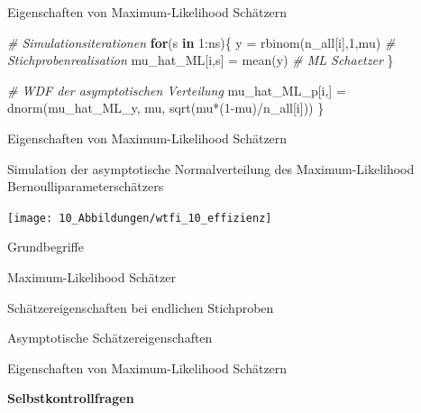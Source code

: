 \documentclass[
  8pt,
  ignorenonframetext,
]{beamer}
\newenvironment{Shaded}{\begin{snugshade}}{\end{snugshade}}
\newcommand{\CommentTok}[1]{\textcolor[rgb]{0.56,0.35,0.01}{\textit{#1}}}
\newcommand{\ControlFlowTok}[1]{\textcolor[rgb]{0.13,0.29,0.53}{\textbf{#1}}}
\newcommand{\DecValTok}[1]{\textcolor[rgb]{0.00,0.00,0.81}{#1}}
\newcommand{\FunctionTok}[1]{\textcolor[rgb]{0.00,0.00,0.00}{#1}}
\newcommand{\NormalTok}[1]{#1}
\newcommand{\OtherTok}[1]{\textcolor[rgb]{0.56,0.35,0.01}{#1}}
\newcommand{\SpecialCharTok}[1]{\textcolor[rgb]{0.00,0.00,0.00}{#1}}
\begin{document}
\begin{frame}[fragile]{Eigenschaften von Maximum-Likelihood Schätzern}
\begin{Shaded}
\begin{Highlighting}[]
    \CommentTok{\# Simulationsiterationen}
    \ControlFlowTok{for}\NormalTok{(s }\ControlFlowTok{in} \DecValTok{1}\SpecialCharTok{:}\NormalTok{ns)\{}
\NormalTok{        y               }\OtherTok{=} \FunctionTok{rbinom}\NormalTok{(n\_all[i],}\DecValTok{1}\NormalTok{,mu)             }\CommentTok{\# Stichprobenrealisation}
\NormalTok{        mu\_hat\_ML[i,s]  }\OtherTok{=} \FunctionTok{mean}\NormalTok{(y)                           }\CommentTok{\# ML Schaetzer}
\NormalTok{    \}}

    \CommentTok{\# WDF der asymptotischen Verteilung}
\NormalTok{    mu\_hat\_ML\_p[i,] }\OtherTok{=} \FunctionTok{dnorm}\NormalTok{(mu\_hat\_ML\_y, mu, }\FunctionTok{sqrt}\NormalTok{(mu}\SpecialCharTok{*}\NormalTok{(}\DecValTok{1}\SpecialCharTok{{-}}\NormalTok{mu)}\SpecialCharTok{/}\NormalTok{n\_all[i]))}
\NormalTok{\}}
\end{Highlighting}
\end{Shaded}
\end{frame}

\begin{frame}{Eigenschaften von Maximum-Likelihood Schätzern}
\protect\hypertarget{eigenschaften-von-maximum-likelihood-schuxe4tzern-2}{}
\small

Simulation der asymptotische Normalverteilung des Maximum-Likelihood
Bernoulliparameterschätzers \vspace{10mm}

\begin{center}\texttt{[image: 10\_Abbildungen/wtfi\_10\_effizienz]} \end{center}
\end{frame}

\begin{frame}{}
\protect\hypertarget{section-12}{}
\large
\vfill
{}

Grundbegriffe

Maximum-Likelihood Schätzer

Schätzereigenschaften bei endlichen Stichproben

Asymptotische Schätzereigenschaften

Eigenschaften von Maximum-Likelihood Schätzern

\textbf{Selbstkontrollfragen} \vfill
\end{frame}
\end{document}
